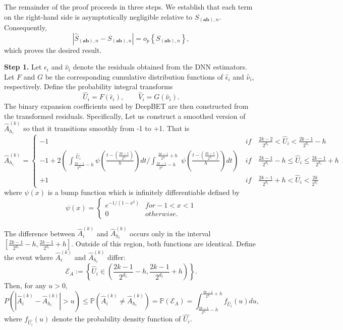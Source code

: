 \documentclass[12pt,reqno,oneside]{amsbook}
\theoremstyle{definition}
\theoremstyle{remark}
\begin{document}
The remainder of the proof proceeds in three steps. We establish that each term on the right-hand side is asymptotically negligible relative to $S_{(\mathbf{ab}),n}$. Consequently,
\[
|\hat{S}_{(\mathbf{ab}),n}-S_{(\mathbf{ab}),n}|
=
o_p\!\left\{S_{(\mathbf{ab}),n}\right\},
\]
which proves the desired result.

\medskip
\textbf{Step 1.}
Let $\hat{\epsilon}_i$ and $\hat{\nu}_i$ denote the residuals obtained from the DNN estimators. Let $F$ and $G$ be the corresponding cumulative distribution functions of $\hat{\epsilon}_i$ and $\hat{\nu}_i$, respectively. Define the probability integral transforms
\[
\hat{U}_i=F(\hat{\epsilon}_i),
\qquad
\hat{V}_i=G(\hat{\nu}_i).
\]
The binary expansion coefficients used by DeepBET are then constructed from the transformed residuals. Specifically,
Let us construct a smoothed version of $\hat{A}_{{h}_i}^{(k)}$ so that it transitions smoothly 
from -1 to +1. That is
\begin{equation} 
    \hat{A}_{{h}_i}^{(k)} = \begin{cases} 
     
      -1 & if\quad   \frac{2k-2}{2^{d_1}} < \hat{U}_{i} < \frac{2k-1}{2^{d_1}}-h \\
      -1 + 2( \,\int_{{\frac{2k-1}{2^{d_1}}}-h}^{\substack{\hat{U}_i}} \psi(\frac{t-(\frac{2k-1}{2^{d_1}})}{h}) dt/ \int_{{\frac{2k-1}{2^{d_1}}}-h}^{\substack{\frac{2k-1}{2^{d_1} } +h}}  \psi(\frac{t-(\frac{2k-1}{2^{d_1}})}{h}) dt ) \,  & if\quad \frac{2k-1}{2^{d_1}}-h \leq \hat{U}_{i} \leq \frac{2k-1}{2^{d_1}} +h \\
      +1 & if \quad \frac{2k-1}{2^{d_1}} + h < \hat{U}_{i}< \frac{2k}{2^{d_1}}
   \end{cases}
\end{equation}
where $\psi(x)$ is a bump function which is infinitely differentiable defined by
\begin{equation} 
    \psi(x) = \begin{cases} 
       e^{-{1}/{(1-x^2)}}& for -1<x<1 \\
       0 & otherwise.
   \end{cases}
\end{equation}

The difference between $\hat{A}_i^{(k)}$ and $\hat{A}_{h_i}^{(k)}$ occurs only in the interval $[\frac{2k-1}{2^{d_1}}-h, \frac{2k-1}{2^{d_1}} +h]$. Outside of this region, both functions are identical.
Define the event where $\hat{A}_i^{(k)}$ and $\hat{A}_{h_i}^{(k)}$ differ:
\[
\mathcal{E}_A := \left\{ \hat{U}_i \in \left( \frac{2k-1}{2^{d_1}} - h, \frac{2k-1}{2^{d_1}} + h \right) \right\}.
\]
Then, for any $u>0$,
$$
P(|\hat{A}_i^{(k)}-\hat{A}_{{h}_i}^{(k)}|>u)
\leq \mathbb{P} \left( \hat{A}_i^{(k)} \neq \hat{A}_{{h}_i}^{(k)} \right) = \mathbb{P} \left( \mathcal{E}_A \right) = \int_{\frac{2k-1}{2^{d_1}} - h}^{\frac{2k-1}{2^{d_1}} + h} f_{\hat{U}_i}(u) du,
$$
where $f_{\hat{U_i}}(u)$ denote the probability density function of $\hat{U_i}$.
\end{document}
